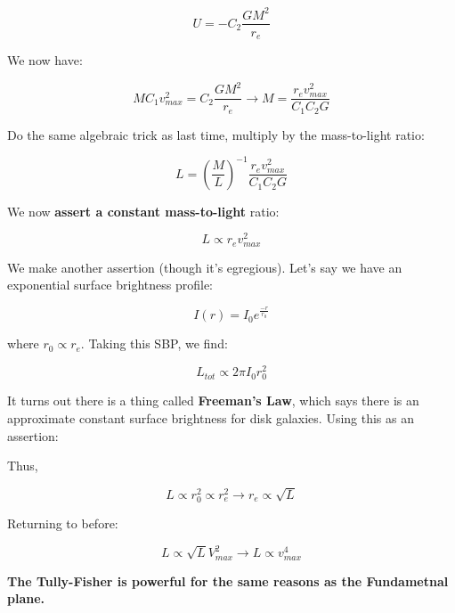 \documentclass{article}
\begin{document}
\begin{equation}
    U = -C_2 \frac{G M^2}{r_e}
\end{equation}

We now have:

\begin{equation}
    M C_1 v_{max}^2 = C_2 \frac{GM^2}{r_e} \rightarrow M = \frac{r_e v_{max}^2}{C_1 C_2 G}
\end{equation}

Do the same algebraic trick as last time, multiply by the mass-to-light ratio:

\begin{equation}
    L = \left(\frac{M}{L}\right)^{-1} \frac{r_e v_{max}^2}{C_1 C_2 G}
\end{equation}

We now \textbf{assert a constant mass-to-light} ratio:

\begin{equation}
    L \propto r_e v_{max}^2
\end{equation}

We make another assertion (though it's egregious). Let's say we have an exponential surface brightness profile:

\begin{equation}
    I(r) = I_0 e^{\frac{-r}{r_0}}
\end{equation}

where $r_0 \propto r_e$. Taking this SBP, we find:

\begin{equation}
    L_{tot} \propto 2\pi I_0 r_0^2
\end{equation}

It turns out there is a thing called \textbf{Freeman's Law}, which says there is an approximate constant surface brightness for disk galaxies. Using this as an assertion:

Thus,

\begin{equation}
    L \propto r_0^2 \propto r_e^2 \rightarrow r_e \propto \sqrt{L}
\end{equation}

Returning to before:

\begin{equation}
    L \propto \sqrt{L} V_{max}^2 \rightarrow \boxed{L \propto v_{max}^4}
\end{equation}

\textbf{The Tully-Fisher is powerful for the same reasons as the Fundametnal plane. }
\end{document}
